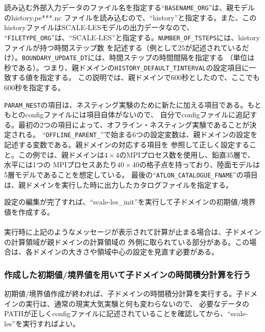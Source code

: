 \noindent 読み込む外部入力データのファイル名を指定する``\verb|BASENAME_ORG|''は、親モデルのhistory.pe***.nc
ファイルを読み込むので、``history''と指定する。また、このhistoryファイルはSCALE-LESモデルの出力データなので、
``\verb|FILETYPE_ORG|''は、``SCALE-LES''と指定する。\verb|NUMBER_OF_TSTEPS|には、historyファイルが持つ時間ステップ数
を記述する（例として25が記述されているだけ）。\verb|BOUNDARY_UPDATE_DT|には、時間ステップの時間間隔を指定する
（単位は秒である）。つまり、親ドメインの\verb|HISTORY_DEFAULT_TINTERVAL|の設定項目に一致する値を指定する。
この説明では、親ドメインで600秒としたので、ここでも600秒を指定する。

\verb|PARAM_NEST|の項目は、ネスティング実験のために新たに加える項目である。もともとのconfigファイルには項目自体がないので、
自分でconfigファイルに追記する。最初の2つの項目によって、オフライン・ネスティング実験であることが決定される。
``\verb|OFFLINE_PARENT_|''で始まる6つの設定変数は、親ドメインの設定を記述する変数である。親ドメインの対応する項目を
参照して正しく設定すること。この例では、親ドメインは$4 \times 4$のMPIプロセス数を使用し、鉛直35層で、水平には1つの
MPIプロセスあたり$40 \times 40$の格子点を持っており、陸面モデルは5層モデルであることを想定している。
最後の``\verb|ATLON_CATALOGUE_FNAME|''の項目は、親ドメインを実行した時に出力したカタログファイルを指定する。

設定の編集が完了すれば、``scale-les\_init''を実行して子ドメインの初期値/境界値を作成する。\\

\\

\noindent 実行時に上記のようなメッセージが表示されて計算が止まる場合は、子ドメインの計算領域が親ドメインの計算領域の
外側に取られている部分がある。この場合は、各ドメインの大きさや領域中心の設定を見直す必要がある。


\subsubsection{作成した初期値/境界値を用いて子ドメインの時間積分計算を行う}
初期値/境界値作成が終われば、子ドメインの時間積分計算を実行する。子ドメインの実行は、通常の現実大気実験と何も変わらないので、
必要なデータのPATHが正しくconfigファイルに記述されていることを確認してから、``scale-les''を実行すればよい。

